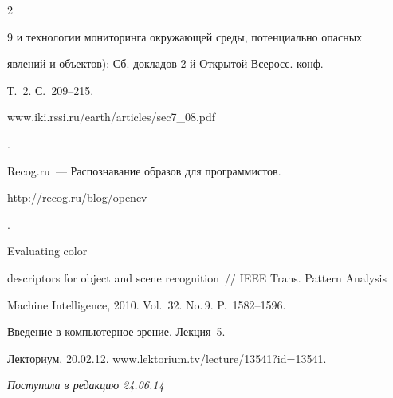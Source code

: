 \begin{multicols}{2}
{{\begin{thebibliography}{9}
и технологии мониторинга окружающей среды, потенциально опасных

явлений и объектов): Сб. докладов 2-й Открытой Всеросс. конф.

Т.~2. С.~209--215. {\sf

www.iki.rssi.ru/earth/articles/sec7\_08.pdf}.



\vspace*{9pt}




Recog.ru~--- Распознавание образов для программистов. {\sf

http://recog.ru/blog/opencv}.



\vspace*{9pt}




 Evaluating color

descriptors for object and scene recognition~// IEEE Trans. Pattern Analysis

Machine Intelligence, 2010. Vol.~32. No.\,9. P.~1582--1596.



\vspace*{9pt}




 Введение в компьютерное зрение. Лекция~5.~---

Лекториум, 20.02.12. {\sf www.lektorium.tv/\linebreak lecture/13541?id=13541}.

 \end{thebibliography}



 }

 }



\end{multicols}



\vspace*{-9pt}



\hfill{\small\textit{Поступила в редакцию 24.06.14}}






